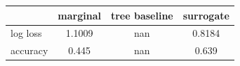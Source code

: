 \begin{tabular}{lccc}
\toprule
 & marginal & tree baseline & surrogate \\
\midrule
log loss & 1.1009 & nan & 0.8184 \\
accuracy & 0.445 & nan & 0.639 \\
\bottomrule
\end{tabular}

